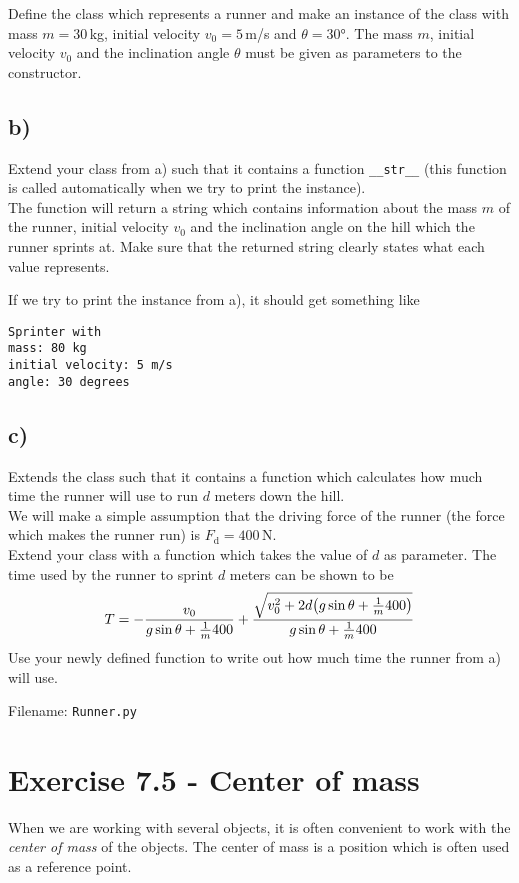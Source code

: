 \documentclass[10pt,a4paper]{article}
\begin{document}
Define the class which represents a runner and make an instance of the class with mass $m = 30\,$kg, initial velocity $v_0 = 5\,$m/s and $\theta = \ang{30}$.  The mass $m$, initial velocity $v_0$ and the inclination angle $\theta$ must be given as parameters to the constructor. 

\subsection*{b)}
Extend your class from a) such that it contains a function \texttt{\_\_str\_\_} (this function is called automatically when we try to print the instance). \\
The function will return a string which contains information about the mass $m$ of the runner, initial velocity $v_0$ and the inclination angle on the hill which the runner sprints at. Make sure that the returned string clearly states what each value represents. 

If we try to print the instance from a), it should get something like
\begin{verbatim}
Sprinter with 
mass: 80 kg 
initial velocity: 5 m/s
angle: 30 degrees
\end{verbatim} 

\subsection*{c)}
Extends the class such that it contains a function which calculates how much time the runner will use to run $d$ meters down the hill. \\
We will make a simple assumption that the driving force of the runner (the force which makes the runner run) is $F_{\text{d}} = 400\,\si{\newton}$. \\
Extend your class with a function which takes the value of $d$ as parameter. The time used by the runner to sprint $d$ meters can be shown to be
\[
T = -\frac{v_0}{g\sin\theta + \frac{1}{m}400} + \frac{\sqrt{v_0^2 + 2d\qty(g\sin\theta + \frac{1}{m}400) }}{g\sin\theta + \frac{1}{m}400}
\]
Use your newly defined function to write out how much time the runner from a) will use.

Filename: \texttt{Runner.py}


\section*{Exercise 7.5 - Center of mass}
When we are working with several objects, it is often convenient to work with the \textit{center of mass} of the objects. The center of mass is a position which is often used as a reference point. 
\end{document}
